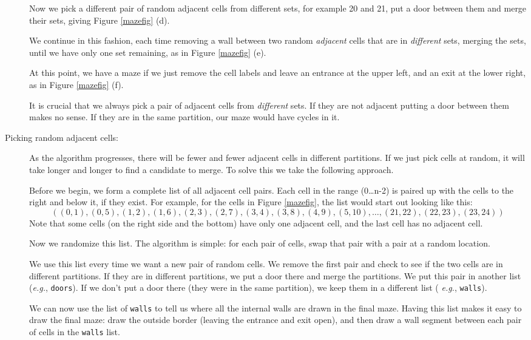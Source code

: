 \documentclass{article}
\begin{document}
\begin{description}
  Now we pick a different pair of random adjacent cells from different
  sets, for example 20 and 21, put a door between them and merge their
  sets, giving Figure
  \ref{mazefig} (d).


  We continue in this fashion, each time removing a wall between two
  random {\em adjacent} cells that are in {\em different} sets,
  merging the sets,  until
  we have only one set remaining, as in Figure \ref{mazefig} (e).  


At this point, we have a maze if we just remove the cell labels
and leave an entrance at the upper left, and an
exit at the lower right, as in Figure \ref{mazefig} (f).
  
It is crucial that we always pick a pair of adjacent cells from {\em
  different} sets.  If they are not adjacent putting a door between
them makes no sense.  If they are in the same partition, our maze
would have cycles in it.


\item[Picking random adjacent cells:] As the algorithm progresses,
  there will be fewer and fewer adjacent cells in different
  partitions.  If we just pick cells at random, it will take longer
  and longer to find a candidate to merge.  To solve this we take the
  following approach.

  Before we begin, we form a complete list of all adjacent cell pairs.
  Each cell in the range (0\ldots n-2) is paired up with the cells to
  the right and below it, if they exist.  For example, for the cells
  in Figure \ref{mazefig}, the list would start out looking like this:
  \[
  ((0,1), (0,5), (1,2), (1,6), (2,3), (2,7), (3,4), (3,8), (4,9),
  (5,10), \ldots, (21,22), (22,23), (23,24) )
  \]
  Note that some cells (on the right side and the bottom) have only
  one adjacent cell, and the last cell has no adjacent cell.

  Now we randomize this list.  The algorithm is simple:  for each
  pair of cells, swap that pair with a pair at a random location.

  We use this list every time we want a new pair of random cells.  We
  remove the first pair and check to see if the two cells are in
  different partitions.  If they are in different partitions, we put a
  door there and merge the partitions.  We put this pair in another
  list ({\em e.g.}, {\tt doors}).  If we don't put a door there (they were
  in the same partition), we keep them in a different list ({\em
    e.g.}, {\tt walls}).

  We can now use the list of {\tt walls} to tell us where all the
  internal walls are drawn in the final maze.  Having this list makes
  it easy to draw the final maze: draw the outside border (leaving the
  entrance and exit open), and then draw a wall segment between each
  pair of cells in the {\tt walls} list.


\end{description}
\end{document}
